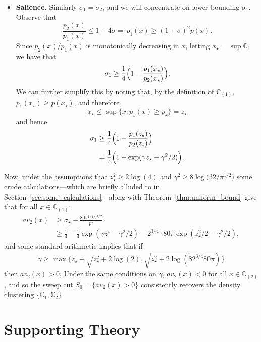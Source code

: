 \documentclass{article}
\newcommand{\1}{\mathbf{1}}
\newcommand{\mc}[1]{\mathcal{#1}}
\newcommand{\mb}[1]{\mathbb{#1}}
\theoremstyle{alden}
\theoremstyle{aldenthm}
\theoremstyle{definition}
\theoremstyle{remark}
\begin{document}
\begin{itemize}
\begin{equation*}
	\end{equation*}
	\item \textbf{Salience.} Similarly $\sigma_{1} = \sigma_2$, and we will concentrate on lower bounding $\sigma_1$. Observe that
	\begin{equation*}
	\frac{p_2(x)}{p_1(x)} \leq 1 - 4\sigma \Longrightarrow p_1(x) \geq (1 + \sigma)^2 p(x).
	\end{equation*}
	Since $p_2(x)/p_1(x)$ is monotonically decreasing in $x$, letting $x_{\star} = \sup \mb{C}_1$ we have that
	\begin{equation*}
	\sigma_1 \geq \frac{1}{4}\Bigl(1 - \frac{p_1(x_{\star})}{p_2(x_{\star})}\Bigr).
	\end{equation*}
	We can further simplify this by noting that, by the definition of $\mb{C}_{(1)}$, $p_1(x_{\star}) \geq p(x_\star)$, and therefore
	\begin{equation*}
	x_{\star} \leq \sup \{x:p_1(x) \geq p_{\star}\} = z_{\star}
	\end{equation*}
	and hence
	\begin{align*}
	\sigma_1 & \geq \frac{1}{4}\Bigl(1 - \frac{p_1(z_{\star})}{p_2(z_{\star})}\Bigr) \\
	& = \frac{1}{4}\Bigl(1 - \exp(\gamma z_{\star} - \gamma^2/2)\Bigr).
	\end{align*}
\end{itemize}
Now, under the assumptions that $z_{\star}^2 \geq 2\log(4)$ and $\gamma^2 \geq 8\log\bigl(32/\pi^{1/2}\bigr)$ some crude calculations---which are briefly alluded to in Section~\ref{sec:some_calculations}---along with Theorem~\ref{thm:uniform_bound} give that for all $x \in \mb{C}_{(1)}$:
\begin{align*}
av_2(x) & \geq \sigma_{\star} - \frac{80 \pi^{1/4} \mc{C}^{1/2}}{p^{\star}} \\
& \geq \frac{1}{4} - \frac{1}{4}\exp(\gamma z^{\star} - \gamma^2/2) - 2^{3/4} \cdot 80\pi\exp(z_{\star}^2/2 - \gamma^2/2),
\end{align*}
and some standard arithmetic implies that if
\begin{equation*}
\gamma \geq \max\biggl\{z_{\star} + \sqrt{z_{\star}^2 + 2\log(2)}, \sqrt{z_{\star}^2 + 2\log(8 2^{3/4} 80 \pi)}  \biggr\}
\end{equation*}
then $av_2(x) > 0$,  Under the same conditions on $\gamma$, $av_2(x) < 0$ for all $x \in \mb{C}_{(2)}$, and so the sweep cut $S_0 = \{av_2(x) > 0\}$ consistently recovers the density clustering $\{\mb{C}_1, \mb{C}_2\}$.

\section{Supporting Theory}
\end{document}
